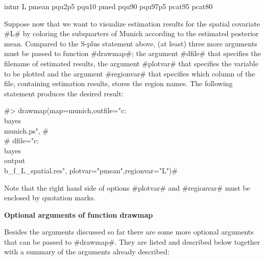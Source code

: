  intnr   L  pmean   pqu2p5   pqu10   pmed   pqu90   pqu97p5 pcat95 pcat80

Suppose now that we want to visualize estimation results for the
spatial covariate #L# by coloring the subquarters of Munich
according to the estimated posterior mean. Compared to the S-plus
statement above, (at least) three more arguments must be passed to
function #drawmap#; the argument #dfile# that specifies the
filename of estimated results, the argument #plotvar# that
specifies the variable to be plotted and the argument #regionvar#
that specifies which column of the file, containing estimation
results, stores the region names. The following statement produces
the desired result:

 #> drawmap(map=munich,outfile="c:\\bayes\\munich.ps", #\\
 #  dfile="c:\\bayes\\output\\b_f_L_spatial.res", plotvar="pmean",regionvar="L")#


Note that the right hand side of options #plotvar# and #regionvar#
must be enclosed by quotation marks.

{\bf Optional arguments of function drawmap}

Besides the arguments discussed so far there are some more
optional arguments that can be passed to #drawmap#. They are
listed and described below together with a summary of the
arguments already described:


